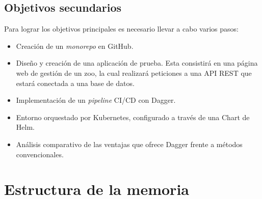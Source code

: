 \subsection*{Objetivos secundarios}

Para lograr los objetivos principales es necesario llevar a cabo varios pasos:

\begin{itemize}
  \item Creación de un \textit{monorepo}\cite{monorepo} en GitHub.
  \item Diseño y creación de una aplicación de prueba. Esta consistirá en una página web de gestión de un zoo, la cual realizará peticiones a una API REST que estará conectada a una base de datos.
  \item Implementación de un \textit{pipeline} CI/CD con Dagger.
  \item Entorno orquestado por Kubernetes\cite{kubernetes}, configurado a través de una Chart de Helm\cite{helm}.
  \item Análisis comparativo de las ventajas que ofrece Dagger frente a métodos convencionales.
\end{itemize}

\section{Estructura de la memoria}

